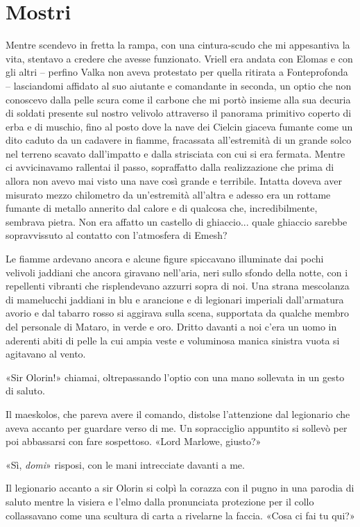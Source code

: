 \chapter{Mostri}

Mentre scendevo in fretta la rampa, con una cintura-scudo che mi
appesantiva la vita, stentavo a credere che avesse funzionato. Vriell
era andata con Elomas e con gli altri -- perfino Valka non aveva
protestato per quella ritirata a Fonteprofonda -- lasciandomi affidato
al suo aiutante e comandante in seconda, un optio che non conoscevo
dalla pelle scura come il carbone che mi portò insieme alla sua decuria
di soldati presente sul nostro velivolo attraverso il panorama primitivo
coperto di erba e di muschio, fino al posto dove la nave dei Cielcin
giaceva fumante come un dito caduto da un cadavere in fiamme, fracassata
all'estremità di un grande solco nel terreno scavato dall'impatto e
dalla strisciata con cui si era fermata. Mentre ci avvicinavamo
rallentai il passo, sopraffatto dalla realizzazione che prima di allora
non avevo mai visto una nave così grande e terribile. Intatta doveva
aver misurato mezzo chilometro da un'estremità all'altra e adesso era un
rottame fumante di metallo annerito dal calore e di qualcosa che,
incredibilmente, sembrava pietra. Non era affatto un castello di
ghiaccio... quale ghiaccio sarebbe sopravvissuto al contatto con
l'atmosfera di {Emesh}?

Le fiamme ardevano ancora e alcune figure spiccavano illuminate dai
pochi velivoli jaddiani che ancora giravano nell'aria, neri sullo sfondo
della notte, con i repellenti vibranti che risplendevano azzurri sopra
di noi. Una strana mescolanza di mamelucchi jaddiani in blu e arancione
e di legionari imperiali dall'armatura avorio e dal tabarro rosso si
aggirava sulla scena, supportata da qualche membro del personale di
Mataro, in verde e oro. Dritto davanti a noi c'era un uomo in aderenti
abiti di pelle la cui ampia veste e voluminosa manica sinistra vuota si
agitavano al vento.

«Sir Olorin!» chiamai, oltrepassando l'optio con una mano sollevata in
un gesto di saluto.

Il maeskolos, che pareva avere il comando, distolse l'attenzione dal
legionario che aveva accanto per guardare verso di me. Un sopracciglio
appuntito si sollevò per poi abbassarsi con fare sospettoso. «Lord
Marlowe, giusto?»

«Sì, \emph{domi}» risposi, con le mani intrecciate davanti a me.

Il legionario accanto a sir Olorin si colpì la corazza con il pugno in
una parodia di saluto mentre la visiera e l'elmo dalla pronunciata
protezione per il collo collassavano come una scultura di carta a
rivelarne la faccia. «Cosa ci fai tu qui?»

